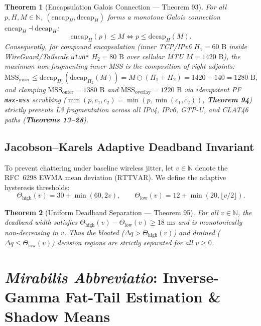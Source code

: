 \documentclass[11pt,a4paper]{article}
\newtheorem{theorem}{Theorem}[section]
\theoremstyle{definition}
\begin{document}
\begin{theorem}[Encapsulation Galois Connection --- Theorem 93]
For all $p, H, M \in \mathbb{N}$, $(\mathrm{encap}_H, \mathrm{decap}_H)$ forms a monotone Galois connection $\mathrm{encap}_H \dashv \mathrm{decap}_H$:
\[
  \mathrm{encap}_H(p) \le M \iff p \le \mathrm{decap}_H(M).
\]
Consequently, for compound encapsulation (inner TCP/IPv6 $H_1 = 60\text{ B}$ inside WireGuard/Tailscale \texttt{utun*} $H_2 = 80\text{ B}$ over cellular MTU $M = 1420\text{ B}$), the maximum non-fragmenting inner MSS is the composition of right adjoints:
\[
  \mathrm{MSS}_{\mathrm{inner}} \le \mathrm{decap}_{H_1}(\mathrm{decap}_{H_2}(M)) = M \ominus (H_1 + H_2) = 1420 - 140 = 1280\text{ B},
\]
and clamping $\mathrm{MSS}_{\mathrm{outer}} = 1380\text{ B}$ and $\mathrm{MSS}_{\mathrm{overlay}} = 1220\text{ B}$ via idempotent PF \texttt{max-mss} scrubbing ($\min(p, c_1, c_2) = \min(p, \min(c_1, c_2))$, \textbf{Theorem 94}) strictly prevents L3 fragmentation across all IPv4, IPv6, GTP-U, and CLAT46 paths (\textbf{Theorems 13--28}).
\end{theorem}

\subsection{Jacobson--Karels Adaptive Deadband Invariant}

To prevent chattering under baseline wireless jitter, let $v \in \mathbb{N}$ denote the RFC~6298 EWMA mean deviation ($\mathrm{RTTVAR}$). We define the adaptive hysteresis thresholds:
\[
  \Theta_{\mathrm{high}}(v) = 30 + \min(60, 2v), \qquad \Theta_{\mathrm{low}}(v) = 12 + \min(20, \lfloor v/2 \rfloor).
\]

\begin{theorem}[Uniform Deadband Separation --- Theorem 95]
For all $v \in \mathbb{N}$, the deadband width satisfies $\Theta_{\mathrm{high}}(v) - \Theta_{\mathrm{low}}(v) \ge 18\text{ ms}$ and is monotonically non-decreasing in $v$. Thus the bloated ($\Delta q > \Theta_{\mathrm{high}}(v)$) and drained ($\Delta q \le \Theta_{\mathrm{low}}(v)$) decision regions are strictly separated for all $v \ge 0$.
\end{theorem}

\section{\emph{Mirabilis Abbreviatio}: Inverse-Gamma Fat-Tail Estimation \& Shadow Means}
\label{sec:taleb}
\end{document}
